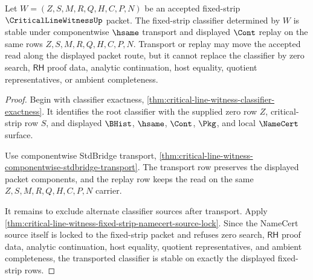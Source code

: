 \begin{theorem}
\label{thm:critical-line-witness-fixed-strip-classifier-stability}
Let $W=(Z,S,M,R,Q,H,C,P,N)$ be an accepted fixed-strip
$\CriticalLineWitnessUp$ packet. The fixed-strip classifier determined by
$W$ is stable under componentwise $\hsame$ transport and displayed $\Cont$
replay on the same rows $Z,S,M,R,Q,H,C,P,N$. Transport or replay may move
the accepted read along the displayed packet route, but it cannot replace
the classifier by zero search, $\mathsf{RH}$ proof data, analytic
continuation, host equality, quotient representatives, or ambient
completeness.
\end{theorem}
\begin{proof}
Begin with classifier exactness,
\autoref{thm:critical-line-witness-classifier-exactness}. It identifies the
root classifier with the supplied zero row $Z$, critical-strip row $S$, and
displayed $\BHist$, $\hsame$, $\Cont$, $\Pkg$, and local $\NameCert$ surface.

Use componentwise StdBridge transport,
\autoref{thm:critical-line-witness-componentwise-stdbridge-transport}. The
transport row preserves the displayed packet components, and the replay row
keeps the read on the same $Z,S,M,R,Q,H,C,P,N$ carrier.

It remains to exclude alternate classifier sources after transport. Apply
\autoref{thm:critical-line-witness-fixed-strip-namecert-source-lock}. Since
the NameCert source itself is locked to the fixed-strip packet and refuses
zero search, $\mathsf{RH}$ proof data, analytic continuation, host equality,
quotient representatives, and ambient completeness, the transported
classifier is stable on exactly the displayed fixed-strip rows.
\end{proof}

